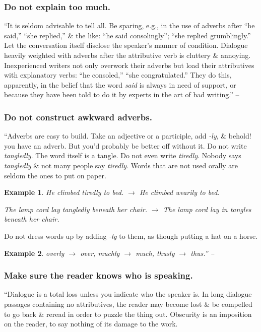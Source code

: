 \documentclass{article}
\newtheorem{example}{Example}
\begin{document}
\subsubsection{Do not explain too much.}
``It is seldom advisable to tell all. Be sparing, e.g., in the use of adverbs after ``he said,'' ``she replied,'' \& the like: ``he said consolingly''; ``she replied grumblingly.'' Let the conversation itself disclose the speaker's manner of condition. Dialogue heavily weighted with adverbs after the attributive verb is cluttery \& annoying. Inexperienced writers not only overwork their adverbs but load their attributives with explanatory verbs: ``he consoled,'' ``she congratulated.'' They do this, apparently, in the belief that the word {\it said} is always in need of support, or because they have been told to do it by experts in the art of bad writing.'' -- \cite[p. 89]{Strunk_White_element_style}


\subsubsection{Do not construct awkward adverbs.}
``Adverbs are easy to build. Take an adjective or a participle, add {\it -ly}, \& behold! you have an adverb. But you'd probably be better off without it. Do not write {\it tangledly}. The word itself is a tangle. Do not even write {\it tiredly}. Nobody says {\it tangledly} \& not many people say {\it tiredly}. Words that are not used orally are seldom the ones to put on paper.
\begin{example}
	He climbed tiredly to bed. $\to$ He climbed wearily to bed.
	
	The lamp cord lay tangledly beneath her chair. $\to$ The lamp cord lay in tangles beneath her chair.
\end{example}
Do not dress words up by adding {\it -ly} to them, as though putting a hat on a horse.
\begin{example}
	overly $\to$ over, muchly $\to$ much, thusly $\to$ thus.'' -- \cite[p. 90]{Strunk_White_element_style}
\end{example}



\subsubsection{Make sure the reader knows who is speaking.}
``Dialogue is a total loss unless you indicate who the speaker is. In long dialogue passages containing no attributives, the reader may become lost \& be compelled to go back \& reread in order to puzzle the thing out. Obscurity is an imposition on the reader, to say nothing of its damage to the work.
\end{document}
